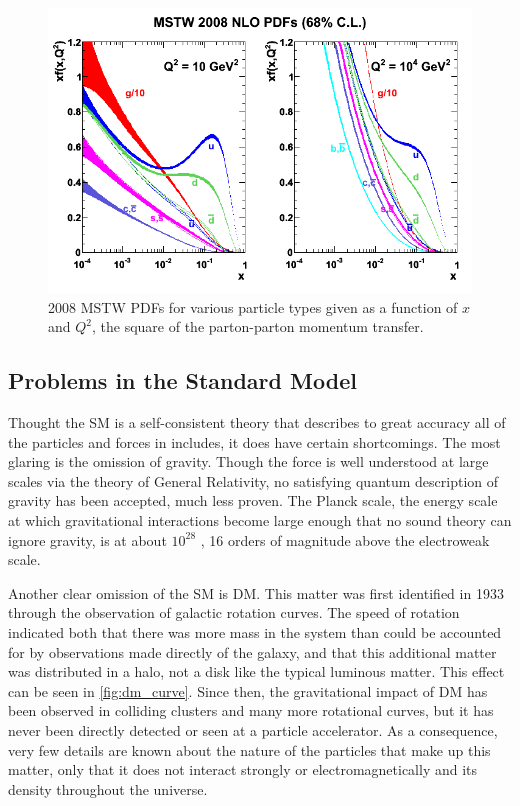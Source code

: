 \begin{centering}
\begin{figure}[bth]
\myfloatalign
\includegraphics[width=.85\linewidth]{figures/theory/mstw2008nlo68cl_allpdfs.png}
\caption{2008 MSTW \acp{PDF} for various particle types given as a function of $x$ and $Q^2$, the square of the parton-parton momentum transfer. \cite{0901.0002}}
\label{fig:pdf}
\end{figure}
\end{centering}




\subsection{Problems in the Standard Model}
\label{sec:sm_problems}

Thought the \ac{SM} is a self-consistent theory that describes to great accuracy all of the particles and forces in includes, it does have certain shortcomings. The most glaring is the omission of gravity. Though the force is well understood at large scales via the theory of General Relativity, no satisfying quantum description of gravity has been accepted, much less proven. The Planck scale, the energy scale at which gravitational interactions become large enough that no sound theory can ignore gravity, is at about $10^{28}$ \eV, 16 orders of magnitude above the electroweak scale. 

Another clear omission of the \ac{SM} is \ac{DM}. This matter was first identified in 1933 through the observation of galactic rotation curves. \cite{zwicky} The speed of rotation indicated both that there was more mass in the system than could be accounted for by observations made directly of the galaxy, and that this additional matter was distributed in a halo, not a disk like the typical luminous matter. This effect can be seen in \autoref{fig:dm_curve}. Since then, the gravitational impact of \ac{DM} has been observed in colliding clusters and many more rotational curves, but it has never been directly detected or seen at a particle accelerator. As a consequence, very few details are known about the nature of the particles that make up this matter, only that it does not interact strongly or electromagnetically and its density throughout the universe. 


